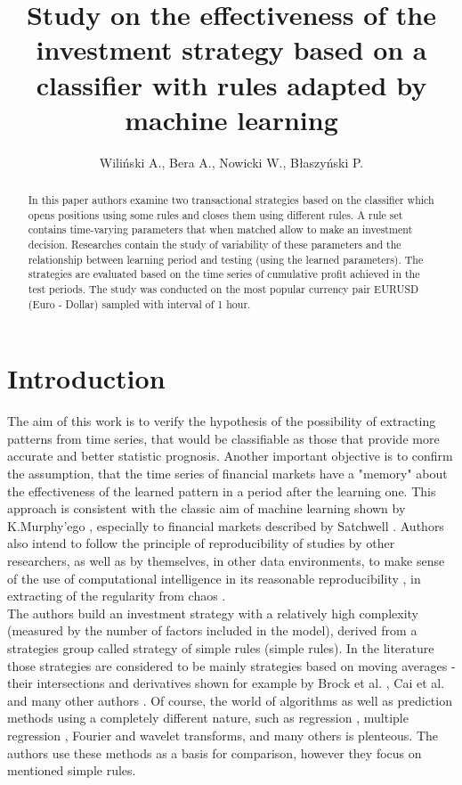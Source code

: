 \documentclass{tewiart}
\title{Study on the effectiveness of the investment strategy based on a classifier with rules adapted by machine learning}
\author{Wiliński A.\inst{1}, Bera A.\inst{1}, Nowicki W.\inst{1}, Błaszyński P.\inst{1}}
\affiliation{%
  \inst{1}West Pomeranian University of Technology, Szczecin, Poland\\
  \{awilinski, abera, wnowicki, pblaszynski\}@wi.zut.edu.pl
}
\begin{document}
\maketitle

\begin{abstract}
In this paper authors examine two transactional strategies based on the classifier which opens positions using some rules and closes them using different rules. A rule set contains time-varying parameters that when matched allow to make an investment decision. Researches contain the study of variability of these parameters and the relationship between learning period and testing (using the learned parameters). The strategies are evaluated based on the time series of cumulative profit achieved in the test periods. The study was conducted on the most popular currency pair EURUSD (Euro - Dollar) sampled with interval of 1 hour.
\end{abstract}

\section{Introduction}
The aim of this work is to verify the hypothesis of the possibility of extracting patterns from time series, that would be classifiable as those that provide more accurate and better statistic prognosis. Another important objective is to confirm the assumption, that the time series of financial markets have a "memory" about the effectiveness of the learned pattern in a period after the learning one.  This approach is consistent with the classic aim of machine learning shown by K.Murphy’ego \cite{Murphy}, especially to financial markets described by Satchwell \cite{Satchwell}. Authors also intend to follow the principle of reproducibility of studies by other researchers, as well as by themselves, in other data environments, to make sense of the use of computational intelligence in its reasonable reproducibility \cite{Polya, Donoho}, in extracting of the regularity from chaos \cite{Ball, Pedrycz}.\\

The authors build an investment strategy with a relatively high complexity (measured by the number of factors included in the model), derived from a strategies group called strategy of simple rules (simple rules). In the literature those strategies are considered to be mainly strategies based on moving averages - their intersections and derivatives shown for example by Brock et al. \cite{Brock}, Cai et al. \cite{Cai} and many other authors \cite{Gencay, LeBaron, Tian}. Of course, the world of algorithms as well as prediction methods using a completely different nature, such as regression \cite{Muriel}, multiple regression \cite{Wilinski, Fujimoto}, Fourier and wavelet transforms, and many others \cite{Raghuraj, KleskWilinski} is plenteous. The authors use these methods as a basis for comparison, however they focus on mentioned simple rules.\\
\end{document}
